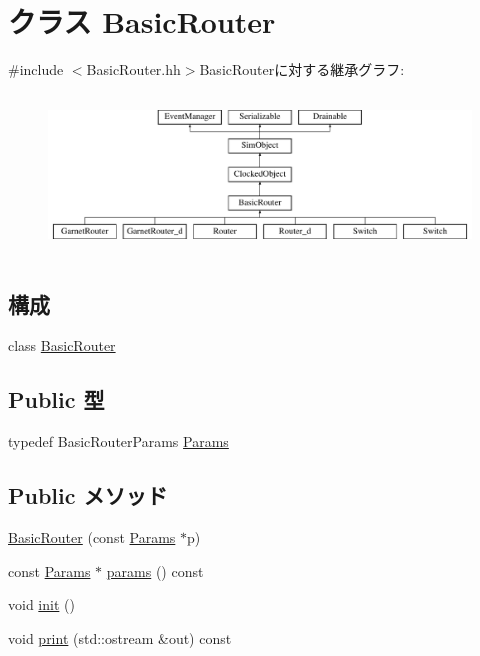 \hypertarget{classBasicRouter}{
\section{クラス BasicRouter}
\label{classBasicRouter}
}


{\ttfamily \#include $<$BasicRouter.hh$>$}BasicRouterに対する継承グラフ:\begin{figure}[H]
\begin{center}
\leavevmode
\includegraphics[height=4.28135cm]{classBasicRouter}
\end{center}
\end{figure}
\subsection*{構成}
\begin{DoxyCompactItemize}
\item 
class \hyperlink{classBasicRouter_1_1BasicRouter}{BasicRouter}
\end{DoxyCompactItemize}
\subsection*{Public 型}
\begin{DoxyCompactItemize}
\item 
typedef BasicRouterParams \hyperlink{classBasicRouter_af2c419269bc768b96a7bae9bfbcd3e94}{Params}
\end{DoxyCompactItemize}
\subsection*{Public メソッド}
\begin{DoxyCompactItemize}
\item 
\hyperlink{classBasicRouter_a127b0f75e5bb61b1cc01126b9206abaf}{BasicRouter} (const \hyperlink{classBasicRouter_af2c419269bc768b96a7bae9bfbcd3e94}{Params} $\ast$p)
\item 
const \hyperlink{classBasicRouter_af2c419269bc768b96a7bae9bfbcd3e94}{Params} $\ast$ \hyperlink{classBasicRouter_acd3c3feb78ae7a8f88fe0f110a718dff}{params} () const 
\item 
void \hyperlink{classBasicRouter_a02fd73d861ef2e4aabb38c0c9ff82947}{init} ()
\item 
void \hyperlink{classBasicRouter_ac55fe386a101fbae38c716067c9966a0}{print} (std::ostream \&out) const 
\end{DoxyCompactItemize}
